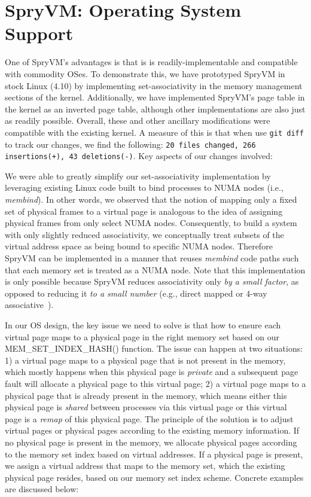 \section{SpryVM: Operating System Support}
\label{sec:os}

One of SpryVM's advantages is that is is readily-implementable and
compatible with commodity OSes. To demonstrate this, we have
prototyped SpryVM in stock Linux (4.10) by implementing set-associativity in
the memory management sections of the kernel. Additionally, we have
implemented SpryVM's page table in the kernel as an inverted page table,
although other implementations are also just as readily possible. 
Overall, these and other ancillary
modifications were compatible with the existing kernel. A measure of
this is that when use \verb|git diff| to track our changes, we find
the following: \texttt{20 files changed, 266 insertions(+), 43
  deletions(-)}. Key aspects of our changes involved:

\vspace{2mm}
 We were
able to greatly simplify our set-associativity implementation by
leveraging existing Linux code built to bind processes to NUMA nodes
(i.e., {\it membind}). In other words, we observed that the notion of
mapping only a fixed set of physical frames to a virtual page is
analogous to the idea of assigning physical frames from only select
NUMA nodes. Consequently, to build a system with only slightly reduced associativity, 
we conceptually treat subsets of the virtual address space as being bound to specific
NUMA nodes. Therefore SpryVM can be implemented in a manner that
reuses {\it membind} code paths such that each memory set is treated
as a NUMA node. Note that this implementation is only possible because SpryVM
reduces associativity only \textit{by a small factor}, as opposed to reducing it
\textit{to a small number} (e.g., direct mapped or 4-way associative~\cite{picorel:near-memory}). 


\vspace{2mm}
 In our OS design, 
the key issue we need to solve is that how to ensure each virtual page 
maps to a physical page in the right memory set based on our MEM\_SET\_INDEX\_HASH() function. 
The issue can happen at two situations: 1) a virtual page maps to a 
physical page that is not present in the memory, which mostly happens
when this physical page is \textit{private} and a subsequent
page fault will allocate a physical page to this virtual page; 
2) a virtual page maps to a physical page that is already present in the memory,
which means either this physical page is \textit{shared} between processes via this
virtual page or this virtual page is a \textit{remap} of this physical page.
The principle of the solution is to adjust virtual pages or physical pages 
according to the existing memory information. If no physical page is present 
in the memory, we allocate physical pages according to the memory set index 
based on virtual addresses. If a physical page is present, we assign a virtual 
address that maps to the memory set, which the existing physical page 
resides, based on our memory set index scheme. Concrete examples are discussed below:

